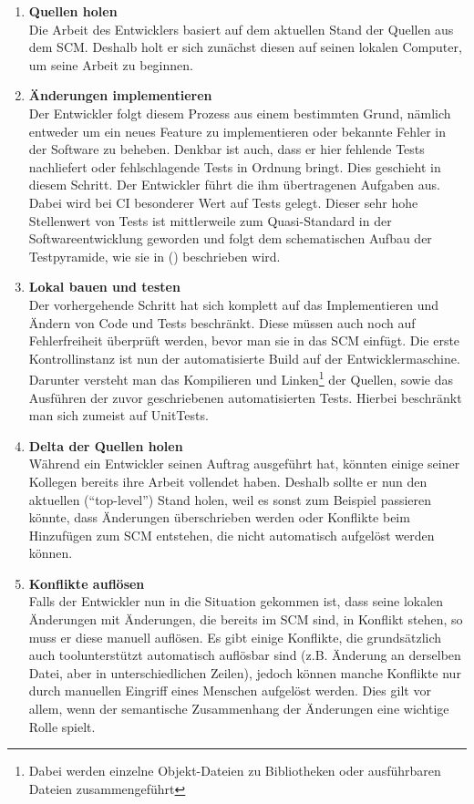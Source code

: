 \begin{enumerate}
	\item \textbf{Quellen holen}\\%
		Die Arbeit des Entwicklers basiert auf dem aktuellen Stand der Quellen aus dem SCM. Deshalb holt er sich zunächst diesen auf seinen lokalen Computer, um seine Arbeit zu beginnen.
		\item \textbf{Änderungen implementieren}\\%
		Der Entwickler folgt diesem Prozess aus einem bestimmten Grund, nämlich entweder um ein neues Feature zu implementieren oder bekannte Fehler in der Software zu beheben. Denkbar ist auch, dass er hier fehlende Tests nachliefert oder fehlschlagende Tests in Ordnung bringt. Dies geschieht in diesem Schritt. Der Entwickler führt die ihm übertragenen Aufgaben aus. Dabei wird bei CI besonderer Wert auf Tests gelegt. Dieser sehr hohe Stellenwert von Tests ist mittlerweile zum Quasi-Standard in der Softwareentwicklung geworden und folgt dem schematischen Aufbau der Testpyramide, wie sie in (\cite{fowler-Testpyramid}) beschrieben wird.
		\item \textbf{Lokal bauen und testen}\\%
		Der vorhergehende Schritt hat sich komplett auf das Implementieren und Ändern von Code und Tests beschränkt. Diese müssen auch noch auf Fehlerfreiheit überprüft werden, bevor man sie in das SCM einfügt. Die erste Kontrollinstanz ist nun der automatisierte Build auf der Entwicklermaschine. Darunter versteht man das Kompilieren und Linken\footnote{Dabei werden einzelne Objekt-Dateien zu Bibliotheken oder ausführbaren Dateien zusammengeführt} der Quellen, sowie das Ausführen der zuvor geschriebenen automatisierten Tests. Hierbei beschränkt man sich zumeist auf UnitTests.
		\item \textbf{Delta der Quellen holen}\\%
		Während ein Entwickler seinen Auftrag ausgeführt hat, könnten einige seiner Kollegen bereits ihre Arbeit vollendet haben. Deshalb sollte er nun den aktuellen ("`top-level"') Stand holen, weil es sonst zum Beispiel passieren könnte, dass Änderungen überschrieben werden oder Konflikte beim Hinzufügen zum SCM entstehen, die nicht automatisch aufgelöst werden können.
		\item \textbf{Konflikte auflösen}\\%
		Falls der Entwickler nun in die Situation gekommen ist, dass seine lokalen Änderungen mit Änderungen, die bereits im SCM sind, in Konflikt stehen, so muss er diese manuell auflösen. Es gibt einige Konflikte, die grundsätzlich auch toolunterstützt automatisch auflösbar sind (z.B. Änderung an derselben Datei, aber in unterschiedlichen Zeilen), jedoch können manche Konflikte nur durch manuellen Eingriff eines Menschen aufgelöst werden. Dies gilt vor allem, wenn der semantische Zusammenhang der Änderungen eine wichtige Rolle spielt.

\end{enumerate}
